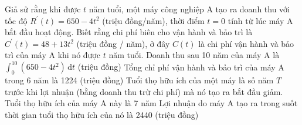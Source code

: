 \begin{ex}
	Giả sử rằng khi được $t$ năm tuổi, một máy công nghiệp A tạo ra doanh thu với tốc độ $R^{\prime}(t)=650-4 t^2$ (triệu đồng/năm), thời điểm $t=0$ tính từ lúc máy A bắt đầu hoạt động. Biết rằng chi phí biên cho vận hành và bảo trì là $C^{\prime}(t)=48+13 t^2$ (triệu đồng / năm), ở đây $C(t)$ là chi phí vận hành và bảo trì của máy A khi nó được $t$ năm tuổi.
	\choiceTF
	{\True Doanh thu sau 10 năm của máy A là $\displaystyle\int_0^{10}\left(650-4 t^2\right)\mathrm{ \,d} t$ (triệu đồng)}
	{\True Tổng chỉ phí vận hành và bảo trì của máy A trong 6 năm là 1224 (triệu đồng)}
	{Tuổi thọ hữu ích của một máy là số năm $T$ trước khi lợi nhuận (bằng doanh thu trừ chi phí) mà nó tạo ra bắt đầu giảm. Tuổi thọ hữu ích của máy A này là 7 năm}
	{Lợi nhuận do máy A tạo ra trong suốt thời gian tuổi thọ hữu ích của nó là 2440 (triệu đồng)}
\end{ex}
